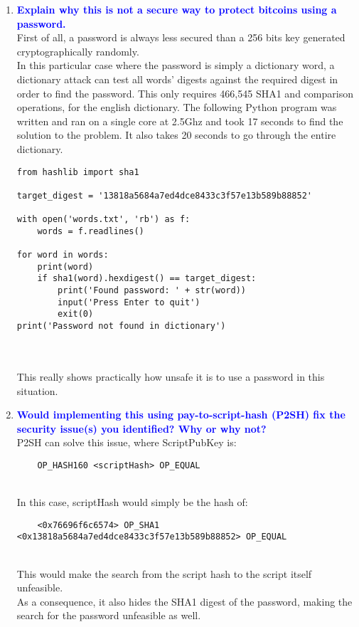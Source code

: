 \documentclass[11pt]{article}
\begin{document}
\begin{enumerate}
\begin{enumerate}
    \item \textbf{\textcolor{blue}{Explain why this is not a secure way to protect bitcoins using a password.}}
        \\ First of all, a password is always less secured than a 256 bits key generated cryptographically randomly. 
        \\ In this particular case where the password is simply a dictionary word, a dictionary attack can test all words' digests against the required digest in order to find the password. This only requires 466,545 SHA1 and comparison operations, for the english dictionary. The following Python program was written and ran on a single core at 2.5Ghz and took 17 seconds to find the solution to the problem. It also takes 20 seconds to go through the entire dictionary.
        
\begin{verbatim}
from hashlib import sha1

target_digest = '13818a5684a7ed4dce8433c3f57e13b589b88852'

with open('words.txt', 'rb') as f:
	words = f.readlines()

for word in words:
	print(word)
	if sha1(word).hexdigest() == target_digest:
		print('Found password: ' + str(word))
		input('Press Enter to quit')
		exit(0)
print('Password not found in dictionary')
\end{verbatim}
    
    \leavevmode
    \\\\ This really shows practically how unsafe it is to use a password in this situation.

    \item \textbf{\textcolor{blue}{Would implementing this using pay-to-script-hash (P2SH) fix the security issue(s) you identified? Why or why not?}}
    \\ P2SH can solve this issue, where ScriptPubKey is:
    \begin{verbatim}
    OP_HASH160 <scriptHash> OP_EQUAL
    \end{verbatim}
    \leavevmode
    \\ In this case, scriptHash would simply be the hash of:
    \begin{verbatim}
    <0x76696f6c6574> OP_SHA1 <0x13818a5684a7ed4dce8433c3f57e13b589b88852> OP_EQUAL
    \end{verbatim}
    \leavevmode
    \\ This would make the search from the script hash to the script itself unfeasible. 
    \\ As a consequence, it also hides the SHA1 digest of the password, making the search for the password unfeasible as well.
    \end{enumerate}
    

\end{enumerate}
\end{document}
